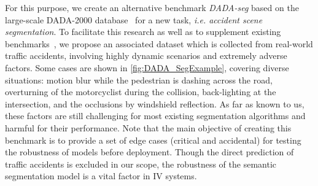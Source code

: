\documentclass[journal]{IEEEtran}
\begin{document}
For this purpose, we create an alternative benchmark \emph{DADA-seg} {based on the large-scale DADA-2000 database~\cite{FangDADA}} for a new task, \emph{i.e. accident scene segmentation}. To facilitate this research as well as to supplement existing benchmarks~\cite{cordts2016cityscapes}\cite{xie2016semantic}\cite{yu2020bdd100k}\cite{wang2019apolloscape}\cite{zendel2018wilddash}, we propose an associated dataset which is collected from real-world traffic accidents, involving highly dynamic scenarios and extremely adverse factors. Some cases are shown in \cref{fig:DADA_SegExample}, covering diverse situations: motion blur while the pedestrian is dashing across the road, overturning of the motorcyclist during the collision, back-lighting at the intersection, and the occlusions by windshield reflection. As far as known to us, these factors are still challenging for most existing segmentation algorithms and harmful for their performance. Note that the main objective of creating this benchmark is to provide a set of edge cases (critical and accidental) for testing the robustness of models before deployment. {Though the direct prediction of traffic accidents is excluded in our scope, the robustness of the semantic segmentation model is a vital factor in IV systems.} 
\end{document}
